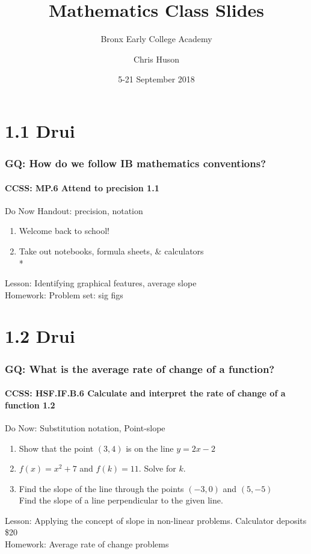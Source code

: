 \documentclass{beamer}
\title{Mathematics Class Slides}
\subtitle{Bronx Early College Academy}
\author{Chris Huson}
\date{5-21 September 2018}
\begin{document}
\frame{\titlepage}


  \section{1.1 Drui}
  \frame
  {
    \frametitle{GQ: How do we follow IB mathematics conventions?}
    \framesubtitle{CCSS: MP.6 Attend to precision   \alert{1.1}}

    \begin{block}{Do Now Handout: precision, notation}
    \begin{enumerate}
        \item Welcome back to school!
        \item Take out notebooks, formula sheets, \& calculators\\*
    \end{enumerate}
    \end{block}
    Lesson: Identifying graphical features, average slope \\%
    Homework: Problem set: sig figs
  }

  \section{1.2 Drui}
  \frame
  {
    \frametitle{GQ: What is the average rate of change of a function?}
    \framesubtitle{CCSS: HSF.IF.B.6 Calculate and interpret the rate of change of a function   \alert{1.2}}

    \begin{block}{Do Now: Substitution notation, Point-slope}
    \begin{enumerate}
        \item Show that the point $(3, 4)$ is on the line $y=2x-2$
        \item $f(x)=x^2+7$ and $f(k)=11$. Solve for $k$.
        \item Find the slope of the line through the points $(-3,0)$ and $(5, -5)$ \\
        Find the slope of a line perpendicular to the given line.
    \end{enumerate}
    \end{block}
    Lesson: Applying the concept of slope in non-linear problems.
    Calculator deposits \$20
    \\%
    Homework: Average rate of change problems
  }
\end{document}
